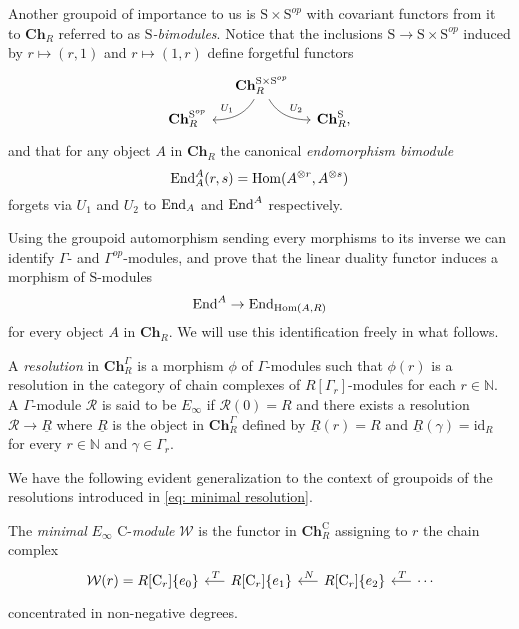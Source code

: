 Another groupoid of importance to us is $\mathrm{S} \times \mathrm{S}^{op}$ with covariant functors from it to $\mathbf{Ch}_R$ referred to as \textit{$\mathrm{S}$-bimodules}.
Notice that the inclusions $\mathrm{S} \to \mathrm{S} \times \mathrm{S}^{op}$ induced by $r \mapsto (r,1)$ and $r \mapsto (1,r)$ define forgetful functors
\begin{equation*}
\begin{tikzcd}[column sep=small, row sep=tiny]
& \mathbf{Ch}_R^{\mathrm{S} \times \mathrm{S}^{op}} \arrow[dl, "U_1"', out=-120, in=0] \arrow[dr, "U_2", out=-60, in=180] & \\
\mathbf{Ch}_R^{\mathrm{S}^{op}} & & \mathbf{Ch}_R^{\mathrm{S}},
\end{tikzcd}
\end{equation*}
and that for any object $A$ in $\mathbf{Ch}_R$ the canonical \textit{endomorphism bimodule}
\begin{equation*}
\mathrm{End}_A^A(r, s) = \mathrm{Hom}(A^{\otimes r}, A^{\otimes s})
\end{equation*}
forgets via $U_1$ and $U_2$ to $\mathrm{End}_A$ and $\mathrm{End}^A$ respectively.

Using the groupoid automorphism sending every morphisms to its inverse we can identify $\Gamma$- and $\Gamma^{op}$-modules, and prove that the linear duality functor induces a morphism of $\mathrm{S}$-modules
\begin{equation*}
\mathrm{End}^A \to \mathrm{End}_{\mathrm{Hom}(A, R)}
\end{equation*}
for every object $A$ in $\mathbf{Ch}_R$.
We will use this identification freely in what follows.

A \textit{resolution} in $\mathbf{Ch}_R^\Gamma$ is a morphism $\phi$ of $\Gamma$-modules such that $\phi(r)$ is a resolution in the category of chain complexes of $R[\Gamma_r]$-modules for each $r \in \mathbb{N}$.
A $\Gamma$-module $\mathcal R$ is said to be $E_\infty$ if $\mathcal R(0) = R$ and there exists a resolution $\mathcal R \to \underline{R}$ where $\underline{R}$ is the object in $\mathbf{Ch}_R^\Gamma$ defined by $\underline{R}(r) = R$ and $\underline{R}(\gamma) = \mathrm{id}_R$ for every $r \in \mathbb{N}$ and $\gamma \in \Gamma_r$.

We have the following evident generalization to the context of groupoids of the resolutions introduced in \eqref{eq: minimal resolution}.

\begin{definition} \label{def: minimal cyclic resolution}
	The \textit{minimal} $E_\infty$ $\mathrm{C}$-\textit{module} $\mathcal W$ is the functor in $\mathbf{Ch}_R^\mathrm{C}$ assigning to $r$ the chain complex
	\begin{equation*}
	\begin{tikzcd} [column sep = .5cm]
	\mathcal W(r) = R[\mathrm{C}_r]\{e_0\} & \arrow[l, "\,T"'] R[\mathrm{C}_r]\{e_1\} & \arrow[l, "\,N"'] R[\mathrm{C}_r]\{e_2\} & \arrow[l, "\,T"'] \cdots
	\end{tikzcd}
	\end{equation*}
	concentrated in non-negative degrees.
\end{definition}

